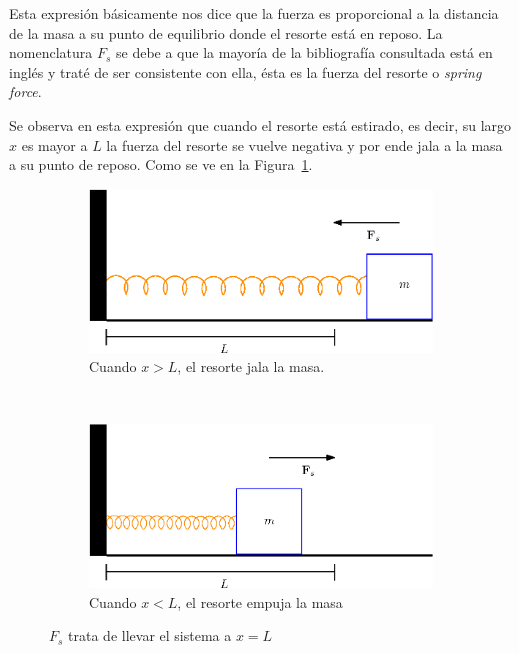 Esta expresión básicamente nos dice que la fuerza es proporcional a la distancia de la masa a su punto de equilibrio donde el resorte está en reposo.
La nomenclatura $F_s$ se debe a que la mayoría de la bibliografía consultada está en inglés y traté de ser consistente con ella, ésta es la fuerza del resorte o \emph{\textenglish{spring force}}.

Se observa en esta expresión que cuando el resorte está estirado, es decir, su largo $x$ es mayor a $L$ la fuerza del resorte se vuelve negativa y por ende jala a la masa a su punto de reposo.
Como se ve en la Figura~\ref{fig:estirada}.

\begin{figure}
 \centering
  \begin{subfigure}[b]{0.5\textwidth}
    \includegraphics[width=\textwidth]{img/01/masaEstirada}
    \caption{Cuando $x>L$, el resorte jala la masa.}
  \label{fig:estirada}
  \end{subfigure}
\\
  \begin{subfigure}[b]{0.5\textwidth}
    \includegraphics[width=\textwidth]{img/01/masaCompresa}
    \caption{Cuando $x<L$, el resorte empuja la masa}
    \label{fig:compresa}
  \end{subfigure}
 \caption[Ley de Hooke para resortes]{ 
 $F_s$ trata de llevar el sistema a $x = L$
 } \label{leyHokke:fig}
\end{figure}

